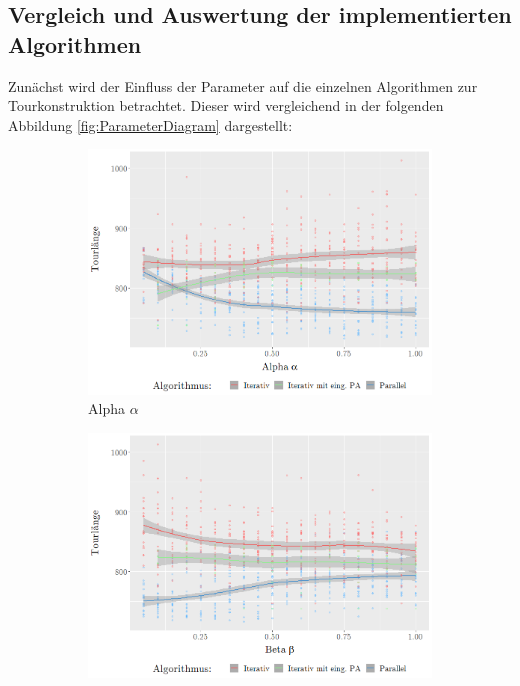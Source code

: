 \documentclass[doktyp=barbeit, sprache=german]{TUBAFarbeiten}
\begin{document}
\subsection{Vergleich und Auswertung der implementierten Algorithmen}
Zunächst wird der Einfluss der Parameter auf die einzelnen Algorithmen zur Tourkonstruktion betrachtet. Dieser wird vergleichend in der folgenden Abbildung \ref{fig:ParameterDiagram} dargestellt:
\begin{figure}
        \centering
        \begin{subfigure}[b]{0.475\textwidth}
            \centering
            \includegraphics[width=\textwidth]{images/diagramalpha}
            \caption{Alpha $\alpha$}               
            \label{fig:iterativeAlpha}
        \end{subfigure}
        \hfill
        \begin{subfigure}[b]{0.475\textwidth}  
            \centering 
            \includegraphics[width=\textwidth]{images/diagrambeta}

\end{subfigure}
\end{figure}
\end{document}
